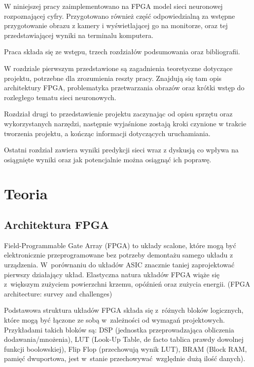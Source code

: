 \documentclass[12pt, oneside, a4paper]{article}
\begin{document}
W niniejszej pracy zaimplementowano na FPGA model sieci neuronowej rozpoznającej
cyfry. Przygotowano również część odpowiedzialną za wstępne przygotowanie
obrazu z kamery i wyświetlającej go na monitorze, oraz tej przedstawiającej
wyniki na terminalu komputera.

Praca składa się ze wstępu, trzech rozdziałów podsumowania oraz bibliografii.

W rozdziale pierwszym przedstawione są zagadnienia teoretyczne dotyczące
projektu, potrzebne dla zrozumienia reszty pracy. Znajdują się tam opis
architektury FPGA, problematyka przetwarzania obrazów oraz krótki wstęp
do rozległego tematu sieci neuronowych.

Rozdział drugi to przedstawienie projektu zaczynając od opisu
sprzętu oraz wykorzystanych narzędzi, następnie wyjaśnione zostają kroki
czynione w trakcie tworzenia projektu, a kończąc informacji dotyczących
uruchamiania.

Ostatni rozdział zawiera wyniki predykcji sieci wraz z dyskusją co wpływa
na osiągnięte wyniki oraz jak potencjalnie można osiągnąć ich poprawę.

\restoregeometry{}

\newpage
\section{Teoria}\label{sec:Teoria}
\subsection{Architektura FPGA}\label{sec:Architektura FPGA}
Field-Programmable Gate Array (FPGA) to układy scalone, które mogą być
elektronicznie przeprogramowane bez potrzeby demontażu samego układu
z urządzenia. W~porównaniu do układów ASIC znacznie taniej zaprojektować
pierwszy działający układ. Elastyczna natura układów FPGA wiąże się z~większym
zużyciem powierzchni krzemu, opóźnień oraz zużycia energii.
 (FPGA architecture: survey and challenges)

Podstawowa struktura układów FPGA składa się z~różnych bloków logicznych,
które mogą być łączone ze sobą w~zależności od wymagań projektowych.
Przykładami takich bloków są:
DSP (jednostka przeprowadzająca obliczenia dodawania/mnożenia),
LUT (Look-Up Table, de facto tablica prawdy dowolnej funkcji boolowskiej),
Flip Flop (przechowują wynik LUT), BRAM (Block RAM, pamięć dwuportowa,
jest w~stanie przechowywać względnie dużą ilość danych).
\end{document}
